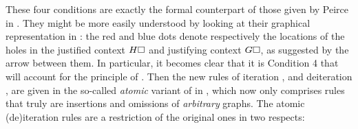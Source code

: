These four conditions are exactly the formal counterpart of those given by
Peirce in \cite{peirce_prolegomena_1906}. They might be more easily understood
by looking at their graphical representation in :
the red and blue dots denote respectively the locations of the holes in the
justified context $H\square$ and justifying context $G\square$, as suggested by the
arrow between them. In particular, it becomes clear that it is Condition 4 that
will account for the principle of . Then the new rules of
iteration ,  and deiteration ,
 are given in the so-called \emph{atomic} variant  of
 in , which now only comprises rules that
truly are insertions and omissions of \emph{arbitrary} graphs. The atomic (de)iteration
rules are a restriction of the original ones in two respects:

